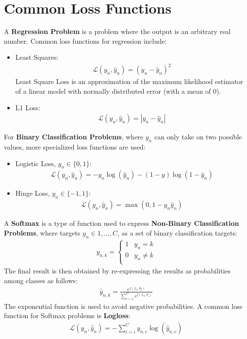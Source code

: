 \documentclass{report}
\newcommand{\tbf}{\textbf}
\newcommand{\loss}{\mathcal{L}}
\newcommand{\yhat}{\hat{y}}
\begin{document}
\section{Common Loss Functions}
A \tbf{Regression Problem} is a problem where the output is an arbitrary real number. Common loss functions for regression include:
\begin{itemize}
 \item Least Squares:
 \begin{align*}
  \loss(y_n, \yhat_n) = (y_n - \yhat_n)^2
 \end{align*}
 Least Square Loss is an approximation of the maximum likelihood estimator of a linear model with normally distributed error (with a mean of 0).
 \item L1 Loss:
 \begin{align*}
  \loss(y_n, \yhat_n) = |y_n - \yhat_n|
 \end{align*}
\end{itemize}
For \tbf{Binary Classification Problems}, where $y_n$ can only take on two possible values, more specialized loss functions are used:
\begin{itemize}
 \item Logistic Loss, $y_n \in \{0,1\}$:
 \begin{align*}
  \loss(y_n, \yhat_n) = -y_n \log(\yhat_n) - (1-y) \log (1-\yhat_n)
 \end{align*}
 \item Hinge Loss, $y_n \in \{-1,1\}$:
 \begin{align*}
  \loss(y_n, \yhat_n) = \max(0,1-y_n\yhat_n)
 \end{align*}
\end{itemize}
A \tbf{Softmax} is a type of function used to express \tbf{Non-Binary Classification Problems}, where targets $y_n \in {1, \hdots, C}$, as a set of binary classification targets:
\begin{align*}
 y_{n,k} = 
\begin{cases}
1 & y_n = k\\
0 & y_n \neq k\\
\end{cases}
\end{align*}
The final result is then obtained by re-expressing the results as probabilities among classes as follows:
\begin{align*}
 \yhat_{n,k} = \frac{e^{f(x_n, \theta_k)}}{\sum_{i=1}^{C}e^{f(x_n, \theta_i)}}
\end{align*}
The exponential function is used to avoid negative probabilities. A common loss function for Softmax problems is \tbf{Logloss}:
\begin{align*}
 \loss(y_n, \yhat_n) = -\sum_{i=i}^{C} y_{n,c} \log(\yhat_{n,c})
\end{align*}
%
\end{document}
